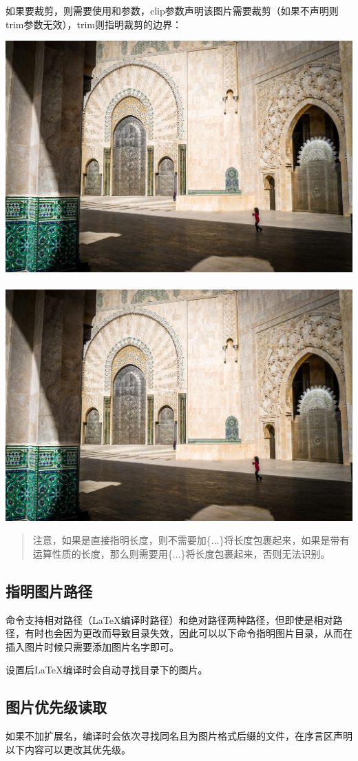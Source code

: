     如果要裁剪，则需要使用和参数，clip参数声明该图片需要裁剪（如果不声明则trim参数无效），trim则指明裁剪的边界：
    \begin{texshow}
        \includegraphics[clip,trim =2cm {0.4\paperheight} 2cm {0.4\paperheight},width=0.3\columnwidth]{contents/fig/mosque.jpg}\\
        \vspace{0.3\columnwidth}\\
        \includegraphics[width=0.3\columnwidth]{contents/fig/mosque.jpg}
    \end{texshow}
    \begin{quotation}
        注意，如果是直接指明长度，则不需要加\{...\}将长度包裹起来，如果是带有运算性质的长度，那么则需要用\{...\}将长度包裹起来，否则无法识别。
    \end{quotation}

    \subsection{指明图片路径}
    命令支持相对路径（\LaTeX{}编译时路径）和绝对路径两种路径，但即使是相对路径，有时也会因为更改而导致目录失效，因此可以以下命令指明图片目录，从而在插入图片时候只需要添加图片名字即可。

    \begin{texcode}
        \graphicspath{{./}{./contents/}{./contents/fig/}}%
    \end{texcode}

    设置后\LaTeX{}编译时会自动寻找目录下的图片。

    \subsection{图片优先级读取}
    如果不加扩展名，编译时会依次寻找同名且为图片格式后缀的文件，在序言区声明以下内容可以更改其优先级。
    \begin{texcode}
    \end{texcode}

